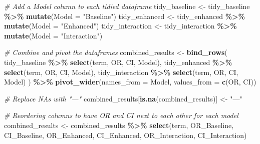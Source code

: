 \documentclass[
]{article}
\newenvironment{Shaded}{\begin{snugshade}}{\end{snugshade}}
\newcommand{\AttributeTok}[1]{\textcolor[rgb]{0.13,0.29,0.53}{#1}}
\newcommand{\CommentTok}[1]{\textcolor[rgb]{0.56,0.35,0.01}{\textit{#1}}}
\newcommand{\FunctionTok}[1]{\textcolor[rgb]{0.13,0.29,0.53}{\textbf{#1}}}
\newcommand{\NormalTok}[1]{#1}
\newcommand{\OtherTok}[1]{\textcolor[rgb]{0.56,0.35,0.01}{#1}}
\newcommand{\SpecialCharTok}[1]{\textcolor[rgb]{0.81,0.36,0.00}{\textbf{#1}}}
\newcommand{\StringTok}[1]{\textcolor[rgb]{0.31,0.60,0.02}{#1}}
\begin{document}
\begin{Shaded}
\begin{Highlighting}[]
\CommentTok{\# Add a \textquotesingle{}Model\textquotesingle{} column to each tidied dataframe}
\NormalTok{tidy\_baseline }\OtherTok{\textless{}{-}}\NormalTok{ tidy\_baseline }\SpecialCharTok{\%\textgreater{}\%} \FunctionTok{mutate}\NormalTok{(}\AttributeTok{Model =} \StringTok{"Baseline"}\NormalTok{)}
\NormalTok{tidy\_enhanced }\OtherTok{\textless{}{-}}\NormalTok{ tidy\_enhanced }\SpecialCharTok{\%\textgreater{}\%} \FunctionTok{mutate}\NormalTok{(}\AttributeTok{Model =} \StringTok{"Enhanced"}\NormalTok{)}
\NormalTok{tidy\_interaction }\OtherTok{\textless{}{-}}\NormalTok{ tidy\_interaction }\SpecialCharTok{\%\textgreater{}\%} \FunctionTok{mutate}\NormalTok{(}\AttributeTok{Model =} \StringTok{"Interaction"}\NormalTok{)}

\CommentTok{\# Combine and pivot the dataframes}
\NormalTok{combined\_results }\OtherTok{\textless{}{-}} \FunctionTok{bind\_rows}\NormalTok{(}
\NormalTok{  tidy\_baseline }\SpecialCharTok{\%\textgreater{}\%} \FunctionTok{select}\NormalTok{(term, OR, CI, Model),}
\NormalTok{  tidy\_enhanced }\SpecialCharTok{\%\textgreater{}\%} \FunctionTok{select}\NormalTok{(term, OR, CI, Model),}
\NormalTok{  tidy\_interaction }\SpecialCharTok{\%\textgreater{}\%} \FunctionTok{select}\NormalTok{(term, OR, CI, Model)}
\NormalTok{) }\SpecialCharTok{\%\textgreater{}\%}
  \FunctionTok{pivot\_wider}\NormalTok{(}\AttributeTok{names\_from =}\NormalTok{ Model, }\AttributeTok{values\_from =} \FunctionTok{c}\NormalTok{(OR, CI))}
\end{Highlighting}
\end{Shaded}

\begin{Shaded}
\begin{Highlighting}[]
\CommentTok{\# Replace NAs with "—"}
\NormalTok{combined\_results[}\FunctionTok{is.na}\NormalTok{(combined\_results)] }\OtherTok{\textless{}{-}} \StringTok{"—"}
\end{Highlighting}
\end{Shaded}

\begin{Shaded}
\begin{Highlighting}[]
\CommentTok{\# Reordering columns to have OR and CI next to each other for each model}
\NormalTok{combined\_results }\OtherTok{\textless{}{-}}\NormalTok{ combined\_results }\SpecialCharTok{\%\textgreater{}\%}
  \FunctionTok{select}\NormalTok{(term, }
\NormalTok{         OR\_Baseline, CI\_Baseline, }
\NormalTok{         OR\_Enhanced, CI\_Enhanced, }
\NormalTok{         OR\_Interaction, CI\_Interaction)}
\end{Highlighting}
\end{Shaded}
\end{document}
